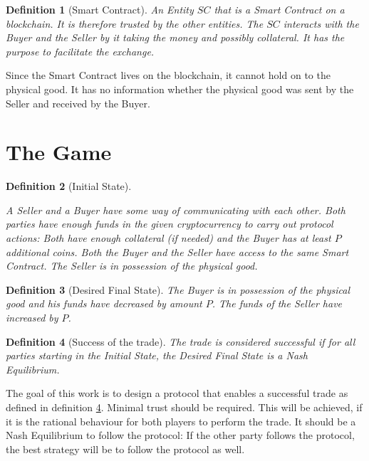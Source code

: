 \documentclass{cacthesis}
\newtheorem{definition}{Definition}
\begin{document}
\begin{definition}[Smart Contract]
An Entity $SC$ that is a Smart Contract on a blockchain. It is therefore trusted by the other entities. The $SC$ interacts with the Buyer and the Seller by it taking the money and possibly collateral. It has the purpose to facilitate the exchange.
\end{definition}
Since the Smart Contract lives on the blockchain, it cannot hold on to the physical good. It has no information whether the physical good was sent by the Seller and received by the Buyer. 

\section{The Game}
\label{sec:the-game}
\begin{definition}[Initial State]
\label{def:initial-state}

A Seller and a Buyer have some way of communicating with each other. Both parties have enough funds in the given cryptocurrency to carry out protocol actions: Both have enough collateral (if needed) and the Buyer has at least $P$ additional coins. Both the Buyer and the Seller have access to the same Smart Contract. The Seller is in possession of the physical good.
\end{definition} 


\begin{definition}[Desired Final State]
\label{def:desired-final-state}
The Buyer is in possession of the physical good and his funds have decreased by amount $P$. The funds of the Seller have increased by $P$.
\end{definition}

\begin{definition}[Success of the trade]
\label{def:success-trade}
The trade is considered successful if for all parties starting in the Initial State, the Desired Final State is a Nash Equilibrium.
\end{definition}

\label{sec:goal}
The goal of this work is to design a protocol that enables a successful trade as defined in definition \ref{def:success-trade}. Minimal trust should be required. This will be achieved, if it is the rational behaviour for both players to perform the trade. It should be a Nash Equilibrium to follow the protocol: If the other party follows the protocol, the best strategy will be to follow the protocol as well.\newline
\end{document}

